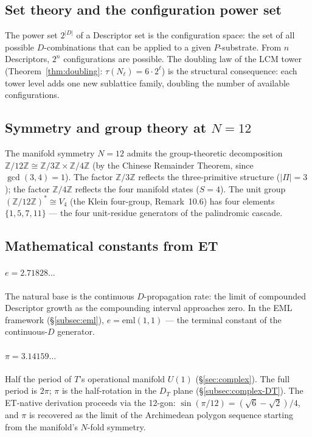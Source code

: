 \documentclass[11pt,a4paper]{article}
\theoremstyle{definition}
\theoremstyle{remark}
\begin{document}
\subsection{Set theory and the configuration power set}\label{subsec:sets-powerset}

The power set $2^{|D|}$ of a Descriptor set is the configuration space: the set of all possible $D$-combinations that can be applied to a given $P$-substrate. From $n$ Descriptors, $2^{n}$ configurations are possible. The doubling law of the LCM tower (Theorem~\ref{thm:doubling}: $\tau(N_{\ell}) = 6 \cdot 2^{\ell}$) is the structural consequence: each tower level adds one new sublattice family, doubling the number of available configurations.

\subsection{Symmetry and group theory at $N = 12$}\label{subsec:groups-N12}

The manifold symmetry $N = 12$ admits the group-theoretic decomposition $\mathbb{Z}/12\mathbb{Z} \cong \mathbb{Z}/3\mathbb{Z} \times \mathbb{Z}/4\mathbb{Z}$ (by the Chinese Remainder Theorem, since $\gcd(3,4) = 1$). The factor $\mathbb{Z}/3\mathbb{Z}$ reflects the three-primitive structure ($|\Pi| = 3$); the factor $\mathbb{Z}/4\mathbb{Z}$ reflects the four manifold states ($S = 4$). The unit group $(\mathbb{Z}/12\mathbb{Z})^{*} \cong V_{4}$ (the Klein four-group, Remark~10.6) has four elements $\{1, 5, 7, 11\}$ --- the four unit-residue generators of the palindromic cascade.

\subsection{Mathematical constants from ET}\label{subsec:constants-ET}

\paragraph{$e = 2.71828\ldots$} The natural base is the continuous $D$-propagation rate: the limit of compounded Descriptor growth as the compounding interval approaches zero. In the EML framework (\S\ref{subsec:eml}), $e = \mathrm{eml}(1,1)$ --- the terminal constant of the continuous-$D$ generator.

\paragraph{$\pi = 3.14159\ldots$} Half the period of $T$'s operational manifold $U(1)$ (\S\ref{sec:complex}). The full period is $2\pi$; $\pi$ is the half-rotation in the $D_{T}$ plane (\S\ref{subsec:complex-DT}). The ET-native derivation proceeds via the 12-gon: $\sin(\pi/12) = (\sqrt{6} - \sqrt{2})/4$, and $\pi$ is recovered as the limit of the Archimedean polygon sequence starting from the manifold's $N$-fold symmetry.
\end{document}
